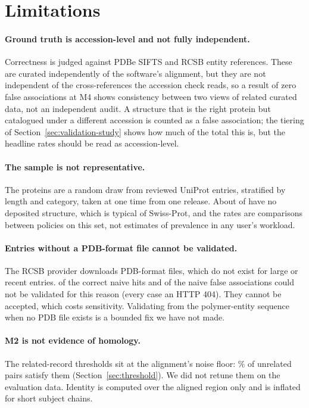 \section{Limitations}
\label{sec:limitations}

\paragraph{Ground truth is accession-level and not fully independent.} Correctness
is judged against PDBe SIFTS and RCSB entity references. These are curated
independently of the software's alignment, but they are not independent of the
cross-references the accession check reads, so a result of zero false associations
at M4 shows consistency between two views of related curated data, not an
independent audit. A structure that is the right protein but catalogued under a
different accession is counted as a false association; the tiering of
Section~\ref{sec:validation-study} shows how much of the total this is, but the
headline rates should be read as accession-level.

\paragraph{The sample is not representative.} The  proteins are a random
draw from reviewed UniProt entries, stratified by length and category, taken at one
time from one release. About  of  have no deposited structure,
which is typical of Swiss-Prot, and the rates are comparisons between policies on
this set, not estimates of prevalence in any user's workload.

\paragraph{Entries without a PDB-format file cannot be validated.} The RCSB
provider downloads PDB-format files, which do not exist for large or recent
entries.  of the  correct naive hits and
 of the  naive false associations could not be
validated for this reason (every case an HTTP 404). They cannot be accepted, which
costs sensitivity. Validating from the polymer-entity sequence when no PDB file
exists is a bounded fix we have not made.

\paragraph{M2 is not evidence of homology.} The related-record thresholds sit at the
alignment's noise floor: \% of unrelated pairs satisfy them
(Section~\ref{sec:threshold}). We did not retune them on the evaluation data.
Identity is computed over the aligned region only and is inflated for short
subject chains.

